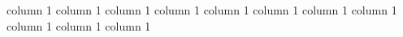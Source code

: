 \documentclass[11pt]{article}
\begin{document}
  
    \begin{center}     column 1  column 1  column 1  column 1  column 1  column 1  column 1  column 1  column 1  column 1  column 1  
 
\end{center}
 
 
\end{document}
